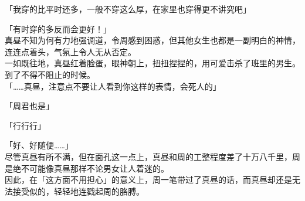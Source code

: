 「我穿的比平时还多，一般不穿这么厚，在家里也穿得更不讲究吧」

「有时穿的多反而会更好！」\\

真昼不知为何有力地强调道，令周感到困惑，但其他女生也都是一副明白的神情，连连点着头，气氛上令人无从否定。\\

一如既往地，真昼红着脸蛋，眼神朝上，扭扭捏捏的，用可爱击杀了班里的男生。到了不得不阻止的时候。\\

「……真昼，注意点不要让人看到你这样的表情，会死人的」

「周君也是」

「行行行」

「好、好随便……」\\

尽管真昼有所不满，但在面孔这一点上，真昼和周的工整程度差了十万八千里，周是绝不可能像真昼那样不论男女让人着迷的。\\

因此，在「这方面不用担心」的意义上，周一笔带过了真昼的话，而真昼却还是无法接受似的，轻轻地连戳起周的胳膊。
